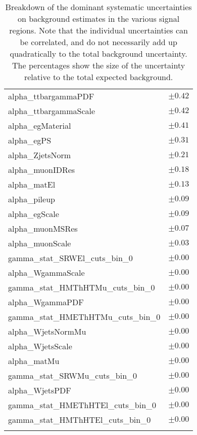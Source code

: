 \begin{table}
\begin{center}
\begin{tabular*}{\textwidth}{@{\extracolsep{\fill}}lc}
alpha\_ttbargammaPDF         & $\pm 0.42$       \\
alpha\_ttbargammaScale         & $\pm 0.42$       \\
alpha\_egMaterial         & $\pm 0.41$       \\
alpha\_egPS         & $\pm 0.31$       \\
alpha\_ZjetsNorm         & $\pm 0.21$       \\
alpha\_muonIDRes         & $\pm 0.18$       \\
alpha\_matEl         & $\pm 0.13$       \\
alpha\_pileup         & $\pm 0.09$       \\
alpha\_egScale         & $\pm 0.09$       \\
alpha\_muonMSRes         & $\pm 0.07$       \\
alpha\_muonScale         & $\pm 0.03$       \\
gamma\_stat\_SRWEl\_cuts\_bin\_0         & $\pm 0.00$       \\
alpha\_WgammaScale         & $\pm 0.00$       \\
gamma\_stat\_HMThHTMu\_cuts\_bin\_0         & $\pm 0.00$       \\
alpha\_WgammaPDF         & $\pm 0.00$       \\
gamma\_stat\_HMEThHTMu\_cuts\_bin\_0         & $\pm 0.00$       \\
alpha\_WjetsNormMu         & $\pm 0.00$       \\
alpha\_WjetsScale         & $\pm 0.00$       \\
alpha\_matMu         & $\pm 0.00$       \\
gamma\_stat\_SRWMu\_cuts\_bin\_0         & $\pm 0.00$       \\
alpha\_WjetsPDF         & $\pm 0.00$       \\
gamma\_stat\_HMEThHTEl\_cuts\_bin\_0         & $\pm 0.00$       \\
gamma\_stat\_HMThHTEl\_cuts\_bin\_0         & $\pm 0.00$       \\
\noalign{\smallskip}\hline\noalign{\smallskip}
\end{tabular*}
\end{center}
\caption[Breakdown of uncertainty on background estimates]{
Breakdown of the dominant systematic uncertainties on background estimates in the various signal regions.
Note that the individual uncertainties can be correlated, and do not necessarily add up quadratically to 
the total background uncertainty. The percentages show the size of the uncertainty relative to the total expected background.
\label{table.results.bkgestimate.uncertainties.WCRhHT}}
\end{table}
%